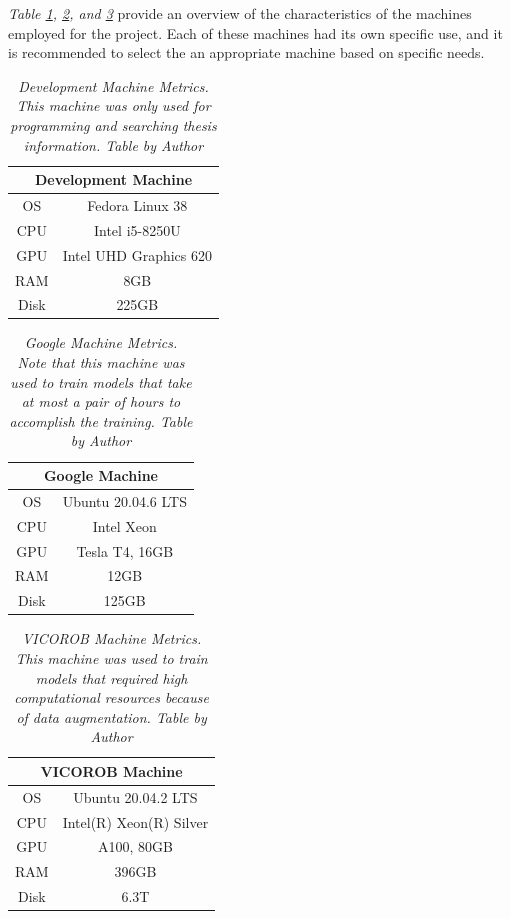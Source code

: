 \textit{Table \ref{table:dev-machine}, \ref{table:google-machine}, and \ref{table:vicorobot-machine}} provide an overview of the characteristics of the machines employed for the project. Each of these machines had its own specific use, and it is recommended to select the an appropriate machine based on specific needs.

\begin{table}[H]
	\centering
	\begin{tabular}{cc}
		\toprule
		\multicolumn{2}{c}{\textbf{Development Machine}} \\
		\midrule
		OS & Fedora Linux 38 \\
		CPU & Intel i5-8250U \\
		GPU & Intel UHD Graphics 620 \\
		RAM & 8GB \\
		Disk & 225GB \\
		\bottomrule
	\end{tabular}
  \caption[Development Machine Metrics.]
  {\textit{Development Machine Metrics.
  This machine was only used for programming and searching thesis information.
  Table by Author}}
	\label{table:dev-machine}
\end{table}


\begin{table}[H]
	\centering
	\begin{tabular}{cc}
			\toprule
			  \multicolumn{2}{c}{\textbf{Google Machine}} \\
			  \midrule
			  OS & Ubuntu 20.04.6 LTS \\
			  CPU & Intel Xeon \\
			  GPU & Tesla T4, 16GB \\
			  RAM & 12GB \\
			  Disk & 125GB \\
			  \bottomrule
\end{tabular}
\caption[Google Machine Metrics.]
  {\textit{Google Machine Metrics.
  Note that this machine was used to train models that take at most a pair of hours to accomplish the training.
  Table by Author}}
{\label{table:google-machine}}
\end{table}

\newpage

\begin{table}[H]
\centering
\begin{tabular}{cc}
	 \toprule
		\multicolumn{2}{c}{\textbf{VICOROB Machine}} \\
		\midrule
		OS & Ubuntu 20.04.2 LTS \\
		CPU & Intel(R) Xeon(R) Silver \\
		GPU & A100, 80GB\\
		RAM & 396GB \\
		Disk & 6.3T \\
		\bottomrule
\end{tabular}
\caption[VICOROB Machine Metrics.]
  {\textit{VICOROB Machine Metrics.
  This machine was used to train models that required high computational resources because of data augmentation.
  Table by Author}}
{\label{table:vicorobot-machine}}
\end{table}

